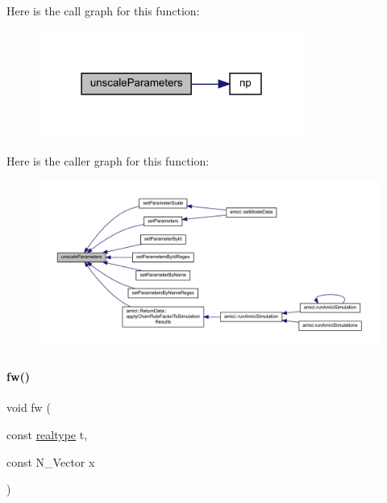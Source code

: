 Here is the call graph for this function\+:
\nopagebreak
\begin{figure}[H]
\begin{center}
\leavevmode
\includegraphics[width=247pt]{classamici_1_1_model_aa47922509b4e6ae5ff93e625f64b9785_cgraph}
\end{center}
\end{figure}
Here is the caller graph for this function\+:
\nopagebreak
\begin{figure}[H]
\begin{center}
\leavevmode
\includegraphics[width=350pt]{classamici_1_1_model_aa47922509b4e6ae5ff93e625f64b9785_icgraph}
\end{center}
\end{figure}
\mbox{\label{classamici_1_1_model_aa8570e0334110a30e2e459efa53df9be}} 
\paragraph{\texorpdfstring{fw()}{fw()}\hspace{0.1cm}{\footnotesize\ttfamily [1/2]}}
{\footnotesize\ttfamily void fw (\begin{DoxyParamCaption}\item[{const \mbox{\hyperlink{namespaceamici_a1bdce28051d6a53868f7ccbf5f2c14a3}{realtype}}}]{t,  }\item[{const N\+\_\+\+Vector}]{x }\end{DoxyParamCaption})}


